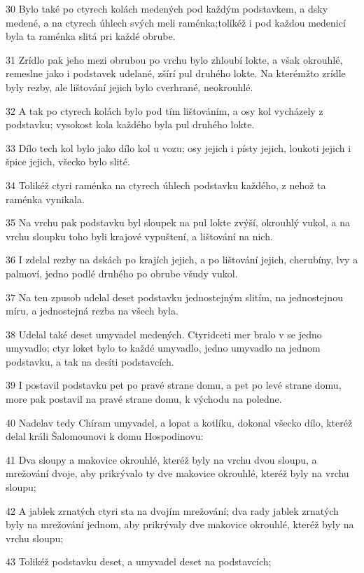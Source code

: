 \par 30 Bylo také po ctyrech kolách medených pod každým podstavkem, a dsky medené, a na ctyrech úhlech svých meli raménka;tolikéž i pod každou medenicí byla ta raménka slitá pri každé obrube.
\par 31 Zrídlo pak jeho mezi obrubou po vrchu bylo zhloubí lokte, a však okrouhlé, remeslne jako i podstavek udelané, zšírí pul druhého lokte. Na kterémžto zrídle byly rezby, ale lištování jejich bylo cverhrané, neokrouhlé.
\par 32 A tak po ctyrech kolách bylo pod tím lištováním, a osy kol vycházely z podstavku; vysokost kola každého byla pul druhého lokte.
\par 33 Dílo tech kol bylo jako dílo kol u vozu; osy jejich i písty jejich, loukoti jejich i špice jejich, všecko bylo slité.
\par 34 Tolikéž ctyri raménka na ctyrech úhlech podstavku každého, z nehož ta raménka vynikala.
\par 35 Na vrchu pak podstavku byl sloupek na pul lokte zvýší, okrouhlý vukol, a na vrchu sloupku toho byli krajové vypuštení, a lištování na nich.
\par 36 I zdelal rezby na dskách po krajích jejich, a po lištování jejich, cherubíny, lvy a palmoví, jedno podlé druhého po obrube všudy vukol.
\par 37 Na ten zpusob udelal deset podstavku jednostejným slitím, na jednostejnou míru, a jednostejná rezba na všech byla.
\par 38 Udelal také deset umyvadel medených. Ctyridceti mer bralo v se jedno umyvadlo; ctyr loket bylo to každé umyvadlo, jedno umyvadlo na jednom podstavku, a tak na desíti podstavcích.
\par 39 I postavil podstavku pet po pravé strane domu, a pet po levé strane domu, more pak postavil na pravé strane domu, k východu na poledne.
\par 40 Nadelav tedy Chíram umyvadel, a lopat a kotlíku, dokonal všecko dílo, kteréž delal králi Šalomounovi k domu Hospodinovu:
\par 41 Dva sloupy a makovice okrouhlé, kteréž byly na vrchu dvou sloupu, a mrežování dvoje, aby prikrývalo ty dve makovice okrouhlé, kteréž byly na vrchu sloupu;
\par 42 A jablek zrnatých ctyri sta na dvojím mrežování; dva rady jablek zrnatých byly na mrežování jednom, aby prikrývaly dve makovice okrouhlé, kteréž byly na vrchu sloupu;
\par 43 Tolikéž podstavku deset, a umyvadel deset na podstavcích;
